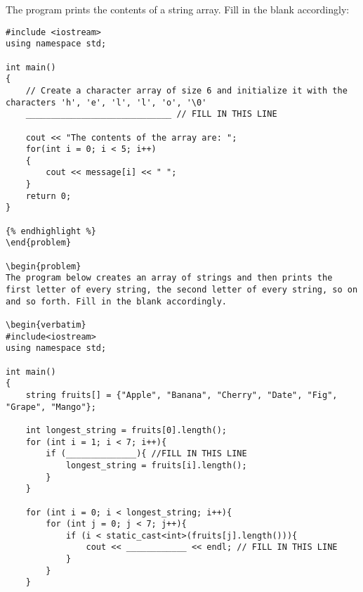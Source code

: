 {{{{{{{{{{{{


\begin{problem}
    The program prints the contents of a string array. Fill in the blank accordingly:

    \begin{verbatim}
#include <iostream>
using namespace std;

int main()
{
    // Create a character array of size 6 and initialize it with the characters 'h', 'e', 'l', 'l', 'o', '\0'
    _____________________________ // FILL IN THIS LINE

    cout << "The contents of the array are: ";
    for(int i = 0; i < 5; i++)
    {
        cout << message[i] << " ";
    }
    return 0; 
}

{% endhighlight %}
\end{problem}

\begin{problem}
The program below creates an array of strings and then prints the first letter of every string, the second letter of every string, so on and so forth. Fill in the blank accordingly.

\begin{verbatim}
#include<iostream>
using namespace std;

int main()
{
    string fruits[] = {"Apple", "Banana", "Cherry", "Date", "Fig", "Grape", "Mango"};

    int longest_string = fruits[0].length();
    for (int i = 1; i < 7; i++){
        if (______________){ //FILL IN THIS LINE
            longest_string = fruits[i].length();
        }
    }

    for (int i = 0; i < longest_string; i++){
        for (int j = 0; j < 7; j++){ 
            if (i < static_cast<int>(fruits[j].length())){
                cout << ____________ << endl; // FILL IN THIS LINE
            }
        }
    }


\end{verbatim}
\end{problem}}}}}}}}}}}}}
